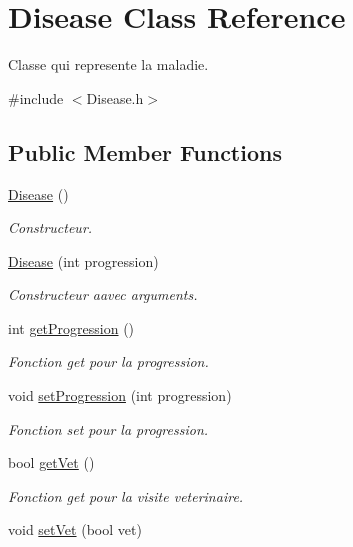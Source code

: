 \hypertarget{class_disease}{\section{Disease Class Reference}
\label{class_disease}
}


Classe qui represente la maladie.  




{\ttfamily \#include $<$Disease.\+h$>$}

\subsection*{Public Member Functions}
\begin{DoxyCompactItemize}
\item 
\hyperlink{class_disease_ad6e040633405552d8e4378a9c9fbabc9}{Disease} ()
\begin{DoxyCompactList}\small\item\em Constructeur. \end{DoxyCompactList}\item 
\hyperlink{class_disease_a2ee1a30596f0c221bcd4984b6e40dc9b}{Disease} (int progression)
\begin{DoxyCompactList}\small\item\em Constructeur aavec arguments. \end{DoxyCompactList}\item 
int \hyperlink{class_disease_a229209c8577331dc500fbae0fb86cd24}{get\+Progression} ()
\begin{DoxyCompactList}\small\item\em Fonction get pour la progression. \end{DoxyCompactList}\item 
void \hyperlink{class_disease_acf13ebe5e8801c249566211252fa3bc3}{set\+Progression} (int progression)
\begin{DoxyCompactList}\small\item\em Fonction set pour la progression. \end{DoxyCompactList}\item 
bool \hyperlink{class_disease_ad8cce9aac5c301bbc751de9c97022b1e}{get\+Vet} ()
\begin{DoxyCompactList}\small\item\em Fonction get pour la visite veterinaire. \end{DoxyCompactList}\item 
void \hyperlink{class_disease_ab3172a26c512139e3953d88f7c0cf492}{set\+Vet} (bool vet)

\end{DoxyCompactItemize}
